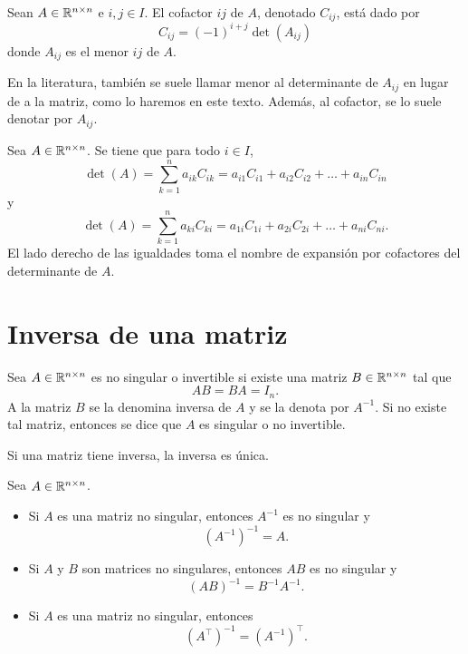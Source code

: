 \documentclass[a4,11pt]{aleph-notas}
\begin{document}
\begin{defi}[Cofactores]
    Sean $A\in \Mat[\R]{n}{n}$ e $i,j\in I$. El cofactor $ij$ de $A$, denotado $C_{ij}$, está dado por
    \[
        C_{ij} = (-1)^{i+j} \det (A_{ij})
    \]
     donde $A_{ij}$ es el menor $ij$ de $A$.
\end{defi}

\begin{advertencia}
    En la literatura, también se suele llamar menor al determinante de $A_{ij}$ en lugar de a la matriz, como lo haremos en este texto. Además, al cofactor, se lo suele denotar por $A_{ij}$.
\end{advertencia}

\begin{teo}
    Sea $A \in \Mat[\R]{n}{n}$. Se tiene que para todo $i\in I$,
    \[
        \det(A) 
        = \sum_{k=1}^n a_{ik}C_{ik} 
        = a_{i1}C_{i1} + a_{i2}C_{i2} + \ldots + a_{in}C_{in}
    \]
    y
    \[
        \det(A) 
        = \sum_{k=1}^n a_{ki}C_{ki} 
        = a_{1i}C_{1i} + a_{2i}C_{2i} + \ldots + a_{ni}C_{ni}.
    \]
    El lado derecho de las igualdades toma el nombre de expansión por cofactores del determinante de $A$.
\end{teo}

\section{Inversa de una matriz}

\begin{defi}
    Sea $A\in \Mat[\R]{n}{n}$ es no singular o invertible si existe una matriz $B\in \Mat[\R]{n}{n}$ tal que 
    \[
        AB = BA = I_n.
    \]
    A la matriz $B$ se la denomina inversa de $A$ y se la denota por $A^{-1}$. Si no existe tal matriz, entonces se dice que $A$ es singular o no invertible. 
\end{defi}

\begin{teo}
    Si una matriz tiene inversa, la inversa es única. 
\end{teo}

\begin{teo}
    Sea $A\in \Mat[\R]{n}{n}$. 
    \begin{itemize}
    \item 
        Si $A$ es una matriz no singular, entonces $A^{-1}$ es no singular y 
        \[ 
            (A^{-1})^{-1} = A.
        \]
    \item 
        Si $A$ y $B$ son matrices no singulares, entonces $AB$ es no singular y 
        \[ 
            (AB)^{-1} = B^{-1}A^{-1}.
        \]
    \item 
        Si $A$ es una matriz no singular, entonces
        \[
            {(A^\intercal)}^{-1} = {(A^{-1})}^\intercal.
        \]
    \end{itemize}
\end{teo}
\end{document}

